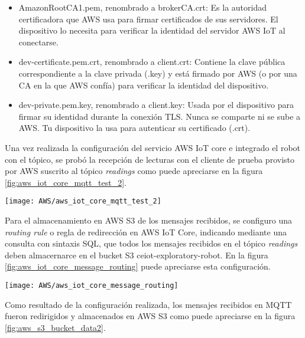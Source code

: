 \begin{itemize}
	\item AmazonRootCA1.pem, renombrado a brokerCA.crt:	Es la autoridad certificadora que AWS usa para firmar certificados de sus servidores. El dispositivo lo necesita para verificar la identidad del servidor AWS IoT al conectarse.
	\item dev-certificate.pem.crt, renombrado a client.crt: Contiene la clave pública correspondiente a la clave privada (.key) y está firmado por AWS (o por una CA en la que AWS confía) para verificar la identidad del dispositivo.
	\item dev-private.pem.key, renombrado a client.key: Usada por el dispositivo para firmar su identidad durante la conexión TLS. Nunca se comparte ni se sube a AWS. Tu dispositivo la usa para autenticar su certificado (.crt).
		
\end{itemize}

Una vez realizada la configuración del servicio AWS IoT core e integrado el robot con el tópico, se probó la recepción de lecturas con el cliente de prueba provisto por AWS suscrito al tópico \textit{readings} como puede apreciarse en la figura \ref{fig:aws_iot_core_mqtt_test_2}.

\begin{center}
   \texttt{[image: AWS/aws\_iot\_core\_mqtt\_test\_2]}
   \label{fig:aws_iot_core_mqtt_test_2}
\end{center}

Para el almacenamiento en AWS S3 de los mensajes recibidos, se configuro una \textit{routing rule} o regla de redirección en AWS IoT Core, indicando mediante una consulta con sintaxis SQL, que todos los mensajes recibidos en el tópico \textit{readings} deben almacernarce en el bucket S3 ceiot-exploratory-robot. En la figura \ref{fig:aws_iot_core_message_routing} puede apreciarse esta configuración.
 

\begin{center}
   \texttt{[image: AWS/aws\_iot\_core\_message\_routing]}
   \label{fig:aws_iot_core_message_routing}
\end{center}

Como resultado de la configuración realizada, los mensajes recibidos en MQTT fueron redirigidos y almacenados en AWS S3 como puede apreciarse en la figura \ref{fig:aws_s3_bucket_data2}.


